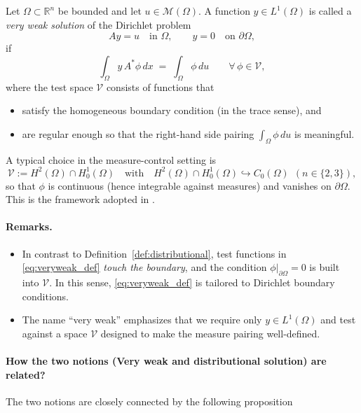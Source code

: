 \documentclass[11pt,a4paper]{article}
\begin{document}
\begin{definition}\label{def:veryweak_dirichlet}
Let $\Omega\subset\mathbb{R}^n$ be bounded and let $u\in\mathcal{M}(\Omega)$.
A function $y\in L^1(\Omega)$ is called a \emph{very weak solution} of the Dirichlet problem
\[
Ay=u \quad\text{in }\Omega,\qquad y=0\quad\text{on }\partial\Omega,
\]
if
\begin{equation}\label{eq:veryweak_def}
\int_\Omega y\,A^*\phi\,dx \;=\; \int_\Omega \phi\,du
\qquad \forall\,\phi\in \mathcal{V},
\end{equation}
where the test space $\mathcal{V}$ consists of functions that
\begin{itemize}
\item satisfy the homogeneous boundary condition (in the trace sense), and
\item are regular enough so that the right-hand side pairing $\int_\Omega \phi\,du$ is meaningful.
\end{itemize}
A typical choice in the measure-control setting is
\[
\mathcal{V} := H^2(\Omega)\cap H^1_0(\Omega)
\quad\text{with}\quad
H^2(\Omega)\cap H^1_0(\Omega)\hookrightarrow C_0(\Omega)
\ \ (n\in\{2,3\}),
\]
so that $\phi$ is continuous (hence integrable against measures) and vanishes on $\partial\Omega$.
This is the framework adopted in \cite{ClasonKunisch2009}.
\end{definition}

\paragraph{Remarks.}
\begin{itemize}
\item In contrast to Definition~\ref{def:distributional}, test functions in \eqref{eq:veryweak_def}
      \emph{touch the boundary}, and the condition $\phi|_{\partial\Omega}=0$ is built into $\mathcal{V}$.
      In this sense, \eqref{eq:veryweak_def} is tailored to Dirichlet boundary conditions.
\item The name ``very weak'' emphasizes that we require only $y\in L^1(\Omega)$ and test against a
      space $\mathcal{V}$ designed to make the measure pairing well-defined.
\end{itemize}

\paragraph{How the two notions (Very weak and distributional solution) are related?}
The two notions are closely connected by the following proposition
\end{document}
